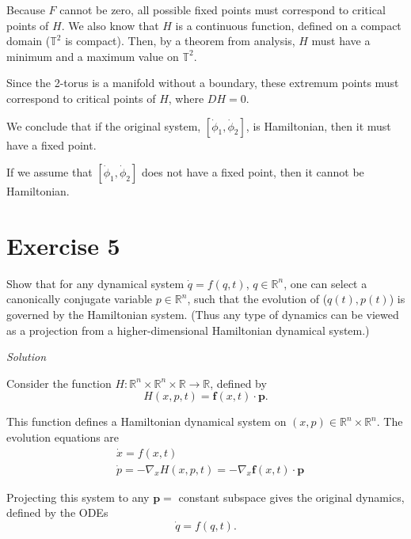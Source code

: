 \documentclass[a4paper,11pt,pdftex]{article}
\newcommand{\R}{\mathbb{R}}
\newcommand{\T}{\mathbb{T}}
\begin{document}
Because $F$ cannot be zero, all possible fixed points must correspond to critical points of $H$. We also know that $H$ is a continuous function, defined on a compact domain ($\T^2$ is compact). Then, by a theorem from analysis, $H$ must have a minimum and a maximum value on $\T^2$. 

Since the 2-torus is a manifold without a boundary, these extremum points must correspond to critical points of $H$, where $DH = 0$. 

We conclude that if the original system, $[\dot{\phi}_1, \dot{\phi}_2]$, is Hamiltonian, then it must have a fixed point. 

If we assume that  $[\dot{\phi}_1, \dot{\phi}_2]$ does not have a fixed point, then it cannot be Hamiltonian. 

\section*{Exercise 5}

Show that for any dynamical system $\dot{q}=f(q,t)$, $q\in \R^n$, one can select a canonically conjugate variable $p\in \R^n$, such that the evolution of ($q(t), p(t)$) is governed by the Hamiltonian system. (Thus any type of dynamics can be viewed as a projection from a higher-dimensional Hamiltonian dynamical system.)

\emph{Solution}

Consider the function $H:\R^n \times \R^n\times \R \to \R$, defined by
$$
H(x,p,t) = \mathbf{f}(x,t)\cdot \mathbf{p}.
$$

This function defines a Hamiltonian dynamical system on $(x,p)\in \R^n\times \R^n$. The evolution equations are
\begin{align}
    &\dot{x} = f(x,t) \\
    &\dot{p} = -\nabla_x H(x,p,t) = -\nabla_x \mathbf{f}(x,t)\cdot \mathbf{p}
\end{align}

Projecting this system to any $\mathbf{p} =$ constant subspace gives the original dynamics, defined by the ODEs
$$
\dot{q} = f(q,t).
$$
\end{document}
